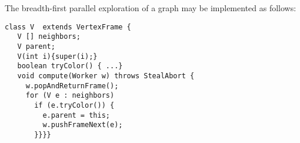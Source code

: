 \begin{example}[BFS] \label{example:bfs-xws}
The breadth-first parallel exploration of a graph may be implemented
as follows:
{\footnotesize
\begin{verbatim}
class V  extends VertexFrame {
   V [] neighbors;
   V parent;
   V(int i){super(i);}
   boolean tryColor() { ...}
   void compute(Worker w) throws StealAbort {
     w.popAndReturnFrame();
     for (V e : neighbors) 
       if (e.tryColor()) {
         e.parent = this;
         w.pushFrameNext(e);
       }}}}
\end{verbatim}}
\end{example}
